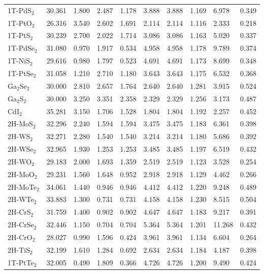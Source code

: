 \begin{center}
\begin{tabularx}{\linewidth}{lXXXXXXXXX}
    1T-PdS$_{2}$ & 30.361  & 1.800  & 2.487  & 1.178  & 3.888  & 3.888  & 1.169  & 6.978  & 0.349 \\
    1T-PtO$_{2}$ & 26.316  & 3.540  & 2.602  & 1.691  & 2.114  & 2.114  & 1.116  & 2.333  & 0.218 \\
    1T-PtS$_{2}$ & 30.239  & 2.700  & 2.022  & 1.714  & 3.086  & 3.086  & 1.163  & 5.020  & 0.337 \\
    1T-PdSe$_{2}$ & 31.080  & 0.970  & 1.917  & 0.534  & 4.958  & 4.958  & 1.178  & 9.789  & 0.374 \\
    1T-NiS$_{2}$ & 29.616  & 0.980  & 1.797  & 0.523  & 4.691  & 4.691  & 1.173  & 8.699  & 0.348 \\
    1T-PtSe$_{2}$ & 31.058  & 1.210  & 2.710  & 1.180  & 3.643  & 3.643  & 1.175  & 6.532  & 0.368 \\
    Ga$_{2}$Se$_{2}$ & 30.000  & 2.810  & 2.657  & 1.764  & 2.640  & 2.640  & 1.281  & 3.915  & 0.524 \\
    Ga$_{2}$S$_{2}$ & 30.000  & 3.250  & 3.351  & 2.358  & 2.329  & 2.329  & 1.256  & 3.173  & 0.487 \\
    CdI$_{2}$ & 35.281  & 3.150  & 1.706  & 1.528  & 1.804  & 1.804  & 1.192  & 2.257  & 0.452 \\
    2H-MoS$_{2}$ & 32.296  & 2.240  & 1.594  & 1.594  & 3.475  & 3.475  & 1.183  & 6.361  & 0.398 \\
    2H-WS$_{2}$ & 32.271  & 2.280  & 1.540  & 1.540  & 3.214  & 3.214  & 1.180  & 5.686  & 0.392 \\
    2H-WSe$_{2}$ & 32.965  & 1.930  & 1.253  & 1.253  & 3.485  & 3.485  & 1.197  & 6.519  & 0.432 \\
    2H-WO$_{2}$ & 29.183  & 2.000  & 1.693  & 1.359  & 2.519  & 2.519  & 1.123  & 3.528  & 0.254 \\
    2H-MoO$_{2}$ & 29.231  & 1.560  & 1.648  & 0.952  & 2.918  & 2.918  & 1.129  & 4.462  & 0.266 \\
    2H-MoTe$_{2}$ & 34.061  & 1.440  & 0.946  & 0.946  & 4.412  & 4.412  & 1.220  & 9.248  & 0.489 \\
    2H-WTe$_{2}$ & 33.883  & 1.300  & 0.731  & 0.731  & 4.158  & 4.158  & 1.230  & 8.515  & 0.504 \\
    2H-CrS$_{2}$ & 31.759  & 1.400  & 0.902  & 0.902  & 4.647  & 4.647  & 1.183  & 9.217  & 0.391 \\
    2H-CrSe$_{2}$ & 32.446  & 1.150  & 0.704  & 0.704  & 5.364  & 5.364  & 1.201  & 11.268  & 0.432 \\
    2H-CrO$_{2}$ & 28.027  & 0.990  & 1.596  & 0.424  & 3.961  & 3.961  & 1.134  & 6.604  & 0.264 \\
    2H-TiS$_{2}$ & 32.199  & 1.610  & 1.284  & 0.692  & 2.634  & 2.634  & 1.184  & 4.187  & 0.398 \\
    1T-PtTe$_{2}$ & 32.005  & 0.490  & 1.809  & 0.366  & 4.726  & 4.726  & 1.200  & 9.490  & 0.424 \\
    \hline
  \end{tabularx}

\end{center}
% 
